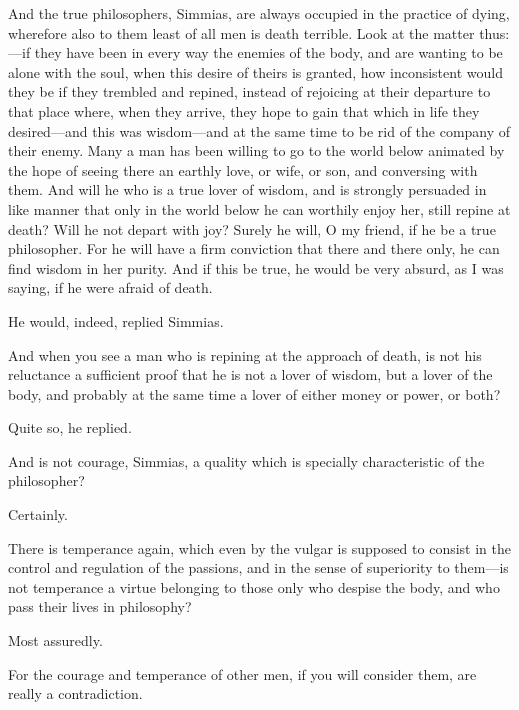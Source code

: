 \documentclass[11pt,letter]{article}
\begin{document}
\par  And the true philosophers, Simmias, are always occupied in the practice of dying, wherefore also to them least of all men is death terrible. Look at the matter thus:—if they have been in every way the enemies of the body, and are wanting to be alone with the soul, when this desire of theirs is granted, how inconsistent would they be if they trembled and repined, instead of rejoicing at their departure to that place where, when they arrive, they hope to gain that which in life they desired—and this was wisdom—and at the same time to be rid of the company of their enemy. Many a man has been willing to go to the world below animated by the hope of seeing there an earthly love, or wife, or son, and conversing with them. And will he who is a true lover of wisdom, and is strongly persuaded in like manner that only in the world below he can worthily enjoy her, still repine at death? Will he not depart with joy? Surely he will, O my friend, if he be a true philosopher. For he will have a firm conviction that there and there only, he can find wisdom in her purity. And if this be true, he would be very absurd, as I was saying, if he were afraid of death.

\par  He would, indeed, replied Simmias.

\par  And when you see a man who is repining at the approach of death, is not his reluctance a sufficient proof that he is not a lover of wisdom, but a lover of the body, and probably at the same time a lover of either money or power, or both?

\par  Quite so, he replied.

\par  And is not courage, Simmias, a quality which is specially characteristic of the philosopher?

\par  Certainly.

\par  There is temperance again, which even by the vulgar is supposed to consist in the control and regulation of the passions, and in the sense of superiority to them—is not temperance a virtue belonging to those only who despise the body, and who pass their lives in philosophy?

\par  Most assuredly.

\par  For the courage and temperance of other men, if you will consider them, are really a contradiction.
\end{document}
